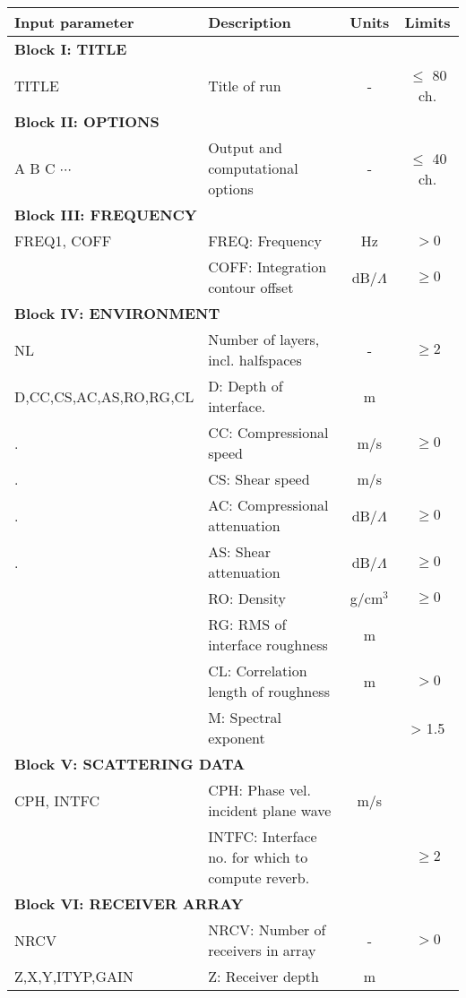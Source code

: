 \begin{table}
\begin{center}
\small
\begin{tabular}{|l|l|c|c|}
\hline \hline
Input parameter & Description & Units & Limits \\
\hline \hline
\multicolumn{4}{|l|}{\bf Block I: TITLE}  \\ \hline
TITLE & Title of run  & - & $\leq$ 80 ch. \\
\hline
\multicolumn{4}{|l|}{\bf Block II: OPTIONS}  \\ \hline
A B C $\cdots$ & Output and computational options & - & $\leq$ 40 ch. \\
\hline
\multicolumn{4}{|l|}{\bf Block III: FREQUENCY}  \\ \hline
FREQ1,  COFF & FREQ: Frequency & Hz & $>0$ \\
 	& COFF: Integration contour offset & dB/$\Lambda$ & $\geq 0$ \\
\hline
\multicolumn{4}{|l|}{\bf Block IV: ENVIRONMENT}  \\ \hline
NL 	& Number of layers, incl. halfspaces	& - & $\geq 2$  \\
D,CC,CS,AC,AS,RO,RG,CL & D: Depth of interface. & m &  \\
.	& CC: Compressional speed & m/s & $\geq 0$ \\
.	& CS: Shear speed & m/s &  \\
.	& AC: Compressional attenuation & dB/$\Lambda$ & $\geq 0$ \\
.	& AS: Shear attenuation & dB/$\Lambda$ & $\geq 0$ \\
	& RO: Density 	& g/cm$^{3}$ & $\geq 0$ \\
	& RG: RMS of interface roughness & m &  \\
	& CL: Correlation length of roughness & m & $>0$ \\
	& M:  Spectral exponent &   & > 1.5 \\
\hline
\multicolumn{4}{|l|}{\bf Block V: SCATTERING DATA}  \\ \hline
CPH, INTFC & CPH: Phase vel. incident plane wave & m/s &  \\
 	& INTFC: Interface no. for which to compute reverb.
&  & $\geq 2$ \\
\hline
\multicolumn{4}{|l|}{\bf Block VI: RECEIVER ARRAY}  \\ \hline
NRCV & NRCV: Number of receivers in array & - & $>0$ \\
Z,X,Y,ITYP,GAIN & Z: Receiver depth & m & \\

\end{tabular}
\end{center}
\end{table}
